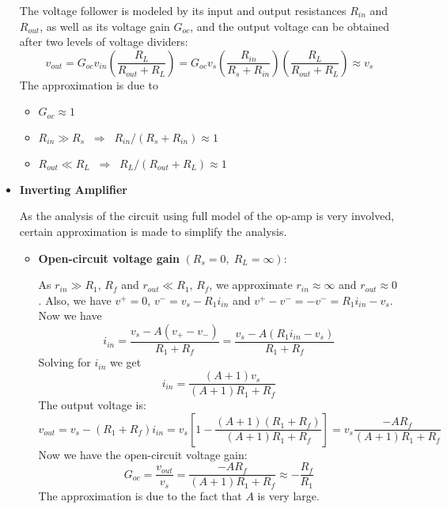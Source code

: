 \begin{itemize}
  The voltage follower is modeled by its input and output resistances 
  $R_{in}$ and $R_{out}$, as well as its voltage gain $G_{oc}$, and the 
  output voltage can be obtained after two levels of voltage dividers:
  \[ 
  v_{out}=G_{oc} v_{in} \left(\frac{R_L}{R_{out}+R_L}\right)=
  G_{oc} v_s \left(\frac{R_{in}}{R_s+R_{in}}\right)\left(\frac{R_L}{R_{out}+R_L}\right)
  \approx v_s
  \]
  The approximation is due to 
  \begin{itemize}
  \item $G_{oc} \approx 1$
  \item 
    $R_{in}\gg R_s \;\;\Longrightarrow \;\;R_{in}/(R_s+R_{in})\approx 1$
  \item 
    $R_{out}\ll R_L\;\;\Longrightarrow \;\;R_L/(R_{out}+R_L) \approx 1$
  \end{itemize}

\item {\bf Inverting Amplifier}


  As the analysis of the circuit using full model of the op-amp is very involved,
  certain approximation is made to simplify the analysis.
  \begin{itemize}
    \item {\bf Open-circuit voltage gain} $(R_s=0,\;R_L=\infty)$:

      As $r_{in}\gg R_1,\,R_f$ and $r_{out}\ll R_1,\,R_f$, we approximate
      $r_{in}\approx \infty$ and $r_{out}\approx 0$. Also, we have
      $v^+=0$, $v^-=v_s-R_1 i_{in}$ and $v^+-v^-=-v^-=R_1 i_{in}-v_s$.
      Now we have
      \[
      i_{in}=\frac{v_s-A(v_+-v_-)}{R_1+R_f}
      =\frac{v_s-A(R_1 i_{in}-v_s)}{R_1+R_f}
      \]
      Solving for $i_{in}$ we get
      \[
      i_{in}=\frac{(A+1)v_s}{(A+1)R_1+R_f}
      \]
      The output voltage is:
      \[
      v_{out}=v_s-(R_1+R_f) i_{in}
      =v_s\left[1-\frac{(A+1)(R_1+R_f)}{(A+1)R_1+R_f}\right] 
      =v_s\frac{-AR_f}{(A+1)R_1+R_f}
      \] 
      Now we have the open-circuit voltage gain:
      \[
      G_{oc}=\frac{v_{out}}{v_s}=\frac{-AR_f}{(A+1)R_1+R_f}
      \approx - \frac{R_f}{R_1} 
      \]
      The approximation is due to the fact that $A$ is very large. 

      \begin{comment}
      This approximate result can also be obtained under the virtual 
      ground assumption $v^-\approx v^+=0$. Applying KCL at the node of 
      $v^-$, we get
      \[
      \frac{v_s}{R_1}+\frac{v_{out}}{R_f}=0,\;\;\;\;\;\mbox{i.e.}\;\;\;\;
      G_{oc}=\frac{v_{out}}{v_s}=-\frac{R_f}{R_1}
      \]
      \end{comment}


\end{itemize}
\end{itemize}
